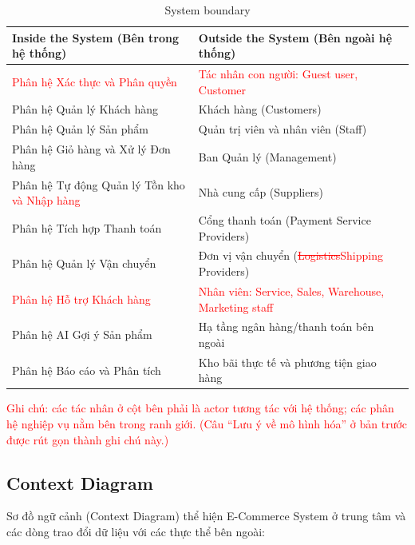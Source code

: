 \documentclass[12pt,a4paper,oneside]{report}
\newif\ifmark \marktrue
\newcommand{\chg}[1]{\ifmark\textcolor{red}{#1}\else #1\fi}
\newcommand{\del}[1]{\ifmark\textcolor{red}{\sout{#1}}\fi}
\begin{document}
\begin{longtable}{p{7.9cm}p{7.9cm}}
\caption{System boundary}\\
\toprule
\textbf{Inside the System (Bên trong hệ thống)} & \textbf{Outside the System (Bên ngoài hệ thống)} \\
\midrule
\endhead
\bottomrule
\endlastfoot
\chg{Phân hệ Xác thực và Phân quyền} & \chg{Tác nhân con người: Guest user, Customer} \\
Phân hệ Quản lý Khách hàng & Khách hàng (Customers) \\
Phân hệ Quản lý Sản phẩm & Quản trị viên và nhân viên (Staff) \\
Phân hệ Giỏ hàng và Xử lý Đơn hàng & Ban Quản lý (Management) \\
Phân hệ Tự động Quản lý Tồn kho \chg{và Nhập hàng} & Nhà cung cấp (Suppliers) \\
Phân hệ Tích hợp Thanh toán & Cổng thanh toán (Payment Service Providers) \\
Phân hệ Quản lý Vận chuyển & Đơn vị vận chuyển (\del{Logistics}\chg{Shipping} Providers) \\
\chg{Phân hệ Hỗ trợ Khách hàng} & \chg{Nhân viên: Service, Sales, Warehouse, Marketing staff} \\
Phân hệ AI Gợi ý Sản phẩm & Hạ tầng ngân hàng/thanh toán bên ngoài \\
Phân hệ Báo cáo và Phân tích & Kho bãi thực tế và phương tiện giao hàng \\
\end{longtable}

\chg{Ghi chú: các tác nhân ở cột bên phải là actor tương tác với hệ thống; các phân hệ nghiệp vụ nằm bên trong ranh giới. (Câu ``Lưu ý về mô hình hóa'' ở bản trước được rút gọn thành ghi chú này.)}

\subsection{Context Diagram}

Sơ đồ ngữ cảnh (Context Diagram) thể hiện E-Commerce System ở trung tâm và các dòng trao đổi dữ liệu với các thực thể bên ngoài:
\end{document}
